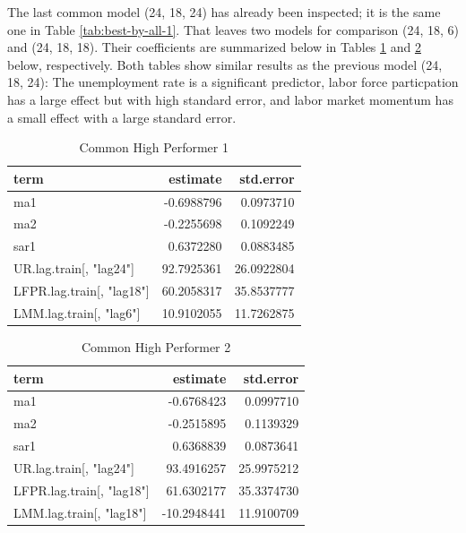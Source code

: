 \documentclass[12pt,letterpaper,toc=flat,oneside]{report}
\theoremstyle{definition}
\theoremstyle{definition}
\theoremstyle{definition}
\theoremstyle{remark}
\begin{document}
The last common model (24, 18, 24) has already been inspected; it is the
same one in Table \ref{tab:best-by-all-1}. That leaves two models for
comparison (24, 18, 6) and (24, 18, 18). Their coefficients are
summarized below in Tables \ref{tab:common-1} and \ref{tab:common-2}
below, respectively. Both tables show similar results as the previous
model (24, 18, 24): The unemployment rate is a significant predictor,
labor force particpation has a large effect but with high standard
error, and labor market momentum has a small effect with a large
standard error.

\begin{table}[!h]

\caption{\label{tab:common-1}Common High Performer 1}
\centering
\begin{tabular}[t]{lrr}
\toprule
\bfseries{term} & \bfseries{estimate} & \bfseries{std.error}\\
\midrule
ma1 & -0.6988796 & 0.0973710\\
ma2 & -0.2255698 & 0.1092249\\
sar1 & 0.6372280 & 0.0883485\\
UR.lag.train[, "lag24"] & 92.7925361 & 26.0922804\\
LFPR.lag.train[, "lag18"] & 60.2058317 & 35.8537777\\
LMM.lag.train[, "lag6"] & 10.9102055 & 11.7262875\\
\bottomrule
\end{tabular}
\end{table}

\begin{table}[!h]

\caption{\label{tab:common-2}Common High Performer 2}
\centering
\begin{tabular}[t]{lrr}
\toprule
\bfseries{term} & \bfseries{estimate} & \bfseries{std.error}\\
\midrule
ma1 & -0.6768423 & 0.0997710\\
ma2 & -0.2515895 & 0.1139329\\
sar1 & 0.6368839 & 0.0873641\\
UR.lag.train[, "lag24"] & 93.4916257 & 25.9975212\\
LFPR.lag.train[, "lag18"] & 61.6302177 & 35.3374730\\
LMM.lag.train[, "lag18"] & -10.2948441 & 11.9100709\\
\bottomrule
\end{tabular}
\end{table}
\end{document}
